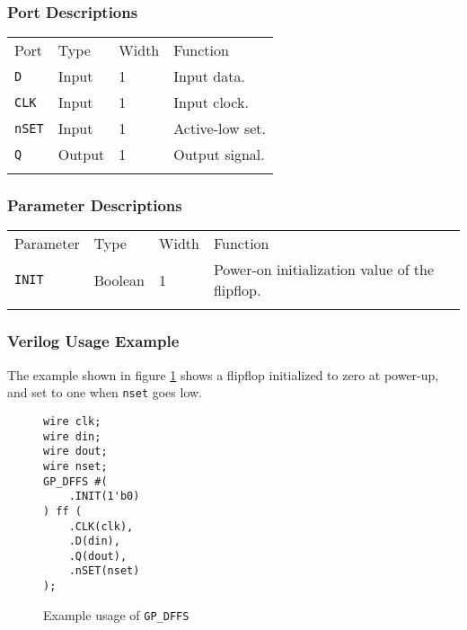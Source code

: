 \documentclass[11pt]{article}
\newcommand{\tokenstyle}[1]{\texttt{#1}}
\newcommand{\wirestyle}[1]{\texttt{#1}}
\newcommand{\whenstyle}[1]{{\fontseries{sb}\selectfont#1}}
\newcommand{\thinhline}{\Xhline{1\arrayrulewidth}}
\newcommand{\thickhline}{\Xhline{2.5\arrayrulewidth}}
\begin{document}
\subsubsection{Port Descriptions}

\begin{tabularx}{\textwidth}{lllX}
\thinhline
\whenstyle{Port} & \whenstyle{Type} & \whenstyle{Width} & \whenstyle{Function} \\
\thickhline
\tokenstyle{D} & Input & 1 & Input data. \\
\thinhline
\tokenstyle{CLK} & Input & 1 & Input clock. \\
\thinhline
\tokenstyle{nSET} & Input & 1 & Active-low set. \\
\thinhline
\tokenstyle{Q} & Output & 1 & Output signal. \\
\thinhline
\end{tabularx}

\subsubsection{Parameter Descriptions}

\begin{tabularx}{\textwidth}{lllX}
\thinhline
\whenstyle{Parameter} & \whenstyle{Type} & \whenstyle{Width} & \whenstyle{Function} \\
\thickhline
\tokenstyle{INIT} & Boolean & 1 & Power-on initialization value of the flipflop. \\
\thinhline
\end{tabularx}

\subsubsection{Verilog Usage Example}

The example shown in figure \ref{gp-dffs-example} shows a flipflop initialized to zero at power-up, and set to one
when \wirestyle{nset} goes low.

\begin{figure}[h]
\begin{lstlisting}
wire clk;
wire din;
wire dout;
wire nset;
GP_DFFS #(
	.INIT(1'b0)
) ff (
	.CLK(clk),
	.D(din),
	.Q(dout),
	.nSET(nset)
);
\end{lstlisting}
\caption{Example usage of \tokenstyle{GP\_DFFS}}
\label{gp-dffs-example}
\end{figure}

\end{document}
